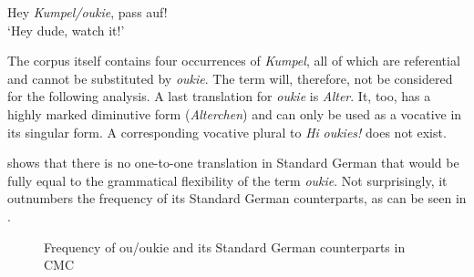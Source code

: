 \documentclass[output=paper]{langsci/langscibook}
\begin{document}
\ea
\label{ex:radke:20}
	Hey \textit{Kumpel/oukie}, pass auf!\smallskip\\\relax
 	‘Hey dude, watch it!’\\
\z


The corpus itself contains four occurrences of \textit{Kumpel}, all of which are referential and cannot be substituted by \textit{oukie}. The term will, therefore, not be considered for the following analysis. A last translation for \textit{oukie} is \textit{Alter}. It, too, has a highly marked diminutive form (\textit{Alterchen}) and can only be used as a vocative in its singular form. A corresponding vocative plural to \textit{Hi} \textit{oukies!} does not exist.

 shows that there is no one-to-one translation in Standard German that would be fully equal to the grammatical flexibility of the term \textit{oukie}. Not surprisingly, it outnumbers the frequency of its Standard German counterparts, as can be seen in .


  \begin{figure}
\caption{Frequency of {ou/oukie} and its Standard German counterparts in CMC\label{fig:radke:4}}
\end{figure}  
\end{document}
